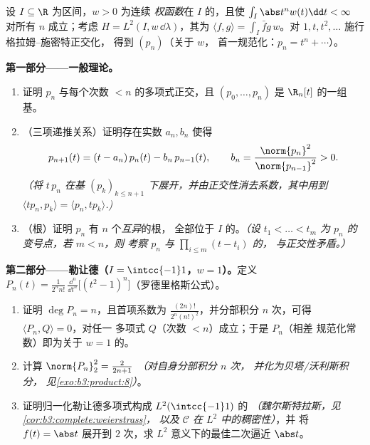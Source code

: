 \begin{problem}\label{pb:b3:hilbert:1}
设 $I \subseteq \R$ 为区间，$w > 0$ 为连续
\emph{权函数}在 $I$ 的，且使 $\int_I
\abs t^nw(t)\dd t < \infty$ 对所有 $n$ 成立；考虑 $H = L^2(I,
w\,\dd\lambda)$，其为 $\langle f, g\rangle = \int_I \bar
fg\,w$。对 $1, t, t^2, \dots$ 施行格拉姆–施密特正交化，
得到\emph{} $(p_n)$（关于 $w$，
首一规范化：$p_n = t^n + \cdots$）。

\medskip
\noindent\textbf{第一部分——一般理论。}
\begin{enumerate}
  \item 证明 $p_n$ 与每个次数
        $< n$ 的多项式正交，且 $(p_0, \dots, p_n)$ 是
        $\R_n[t]$ 的一组基。
  \item （三项递推关系）证明存在实数 $a_n,
        b_n$ 使得
        \[
        p_{n+1}(t) = (t - a_n)\,p_n(t) - b_n\,p_{n-1}(t),
        \qquad b_n = \frac{\norm{p_n}^2}{\norm{p_{n-1}}^2} >
        0 .
        \]
        \emph{（将 $t\,p_n$ 在基 $(p_k)_{k \leq
        n+1}$ 下展开，并由正交性消去系数，其中用到
        $\langle tp_n, p_k\rangle = \langle p_n,
        tp_k\rangle$.)}
  \item （根）证明 $p_n$ 有 $n$ 个\emph{互异}的根，
        全部位于 $I$ 的。\emph{（设 $t_1 < \dots < t_m$ 为
        $p_n$ 的变号点，若 $m < n$，则
        考察 $p_n$ 与 $\prod_{i\leq m}(t - t_i)$ 的，
        与正交性矛盾。）}
\end{enumerate}

\medskip
\noindent\textbf{第二部分——勒让德（$I = \intcc{-1}1$，$w =
1$）。}定义 $P_n(t) = \frac{1}{2^nn!}\,\frac{\dd^n}{\dd
t^n}\bigl[(t^2 - 1)^n\bigr]$（罗德里格斯公式）。
\begin{enumerate}[resume]
  \item 证明 $\deg P_n = n$，且首项系数为
        $\frac{(2n)!}{2^n(n!)^2}$，并分部积分
        $n$ 次，可得 $\langle P_n, Q\rangle = 0$，对任一
        多项式 $Q$（次数 $< n$）成立；于是 $P_n$（相差
        规范化常数）即为关于 $w = 1$ 的。
  \item 计算 $\norm{P_n}_2^2 = \frac{2}{2n+1}$
        \emph{（对自身分部积分 $n$ 次，
        并化为贝塔/沃利斯积分，
        见\cref{exo:b3:product:8}）}。
  \item 证明归一化勒让德多项式构成
        $L^2(\intcc{-1}1)$ 的
        \emph{（魏尔斯特拉斯，见\cref{cor:b3:complete:weierstrass}，
        以及 $\mathcal C$ 在 $L^2$ 中的稠密性）}，并
        将 $f(t) = \abs t$ 展开到 $2$ 次，求
        $L^2$ 意义下的最佳二次逼近 $\abs t$。
\end{enumerate}


\end{problem}
